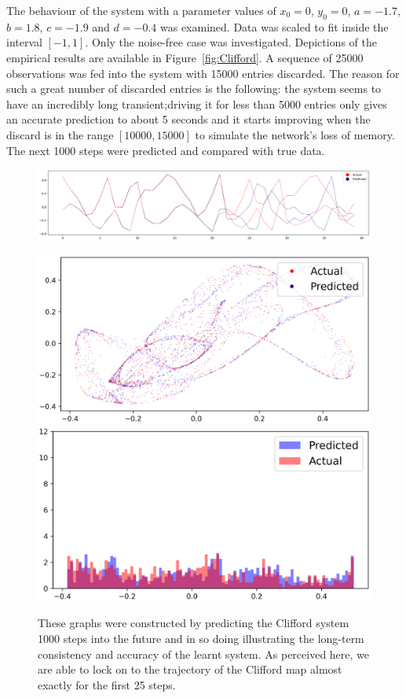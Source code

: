The behaviour of the system with a parameter values of $x_0=0$, $y_0=0$, $a = -1.7$,  $b = 1.8$, $c = -1.9$ and $d = -0.4$ was examined. 
Data was scaled to fit inside the interval $[-1,1]$. Only the noise-free case was investigated. 
Depictions of the empirical results are available in Figure~\ref{fig:Clifford}.
 A sequence of 25000 observations was fed into the system with 15000 entries discarded. 
 The reason for such a great number of discarded entries is the following: the system seems to have an incredibly long transient;driving it for less than 5000 entries only gives an accurate prediction to about 5 seconds and it starts improving when the discard is in the range $[10000,15000]$ to simulate the network's loss of memory. The next 1000 steps were predicted and compared with true data.


\begin{figure}[ht]
  \centering
  \includegraphics[width=1.0\textwidth,left]{Graphs/_Clifford_1_nonoise.eps}
  \caption*{These graphs were constructed by predicting the Clifford system 1000 steps into the future and in so doing illustrating the long-term consistency and accuracy of the learnt system. As perceived here, we are able to lock on to the trajectory of the Clifford map almost exactly for the first 25 steps.}
      \centering
      \includegraphics[width=\linewidth]{Graphs/_Clifford_2_nonoise.eps}
  \endminipage\hfill
    \centering
    \includegraphics[width=\linewidth]{Graphs/_Clifford_3_nonoise.eps}

\end{figure}
